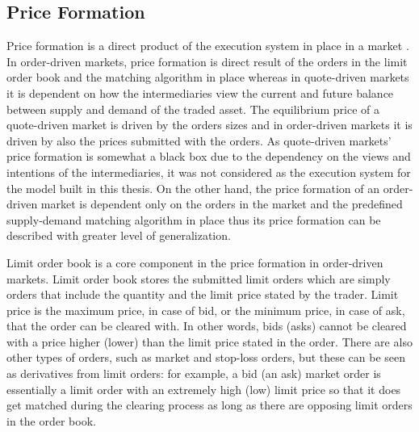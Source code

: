 \subsection{Price Formation}
Price formation is a direct product of the execution system in place in a market
\citep{boer05}. In order-driven markets, price formation is direct result of the orders
in the limit order book and the matching algorithm in place whereas in quote-driven markets it
is dependent on how the intermediaries view the current and future 
balance between supply and demand of the traded asset. The equilibrium price of a 
quote-driven market is driven by the orders sizes and in order-driven markets
it is driven by also the prices submitted with the orders. \citep{MALINOVA2013104}
As quote-driven markets' price formation is somewhat a black box due to the 
dependency on the views and intentions of the intermediaries, it was not considered
as the execution system for the model built in this thesis. On the other hand, %
the price formation of an order-driven market is dependent only on the orders in the
market and the predefined supply-demand matching algorithm in place thus its price 
formation can be described with greater level of generalization.

Limit order book is a core component in the price formation in order-driven markets.
Limit order book stores the submitted limit orders which are simply orders that include the quantity and 
the limit price stated by the trader. Limit price is the maximum price, in case of bid, or the minimum
price, in case of ask, that the order can be cleared with. In other words,
bids (asks) cannot be cleared with a price higher (lower) than the limit price stated 
in the order. There are also other types of orders, such as market and 
stop-loss orders, but these can be seen as derivatives from limit orders: 
for example, a bid (an ask) market order is essentially a limit order 
with an extremely high (low) limit price so that it does get matched 
during the clearing process as long as there are opposing limit orders in the 
order book. \citep{lob13} %

